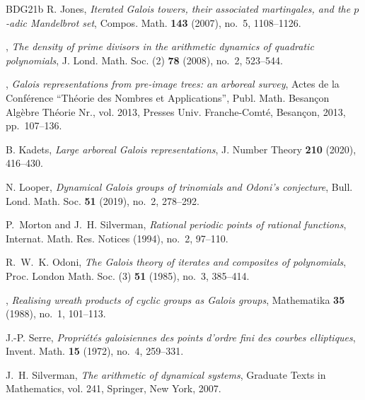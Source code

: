 \begin{thebibliography}{BDG{\etalchar{+}}21b}
R. Jones, \emph{Iterated {G}alois towers, their associated martingales, and
  the {$p$}-adic {M}andelbrot set}, Compos. Math. \textbf{143} (2007), no.~5,
  1108--1126.

\bysame, \emph{The density of prime divisors in the arithmetic dynamics of
  quadratic polynomials}, J. Lond. Math. Soc. (2) \textbf{78} (2008), no.~2,
  523--544.

\bysame, \emph{Galois representations from pre-image trees: an arboreal
  survey}, Actes de la {C}onf\'erence ``{T}h\'eorie des {N}ombres et
  {A}pplications'', Publ. Math. Besan\c con Alg\`ebre Th\'eorie Nr., vol. 2013,
  Presses Univ. Franche-Comt\'e, Besan\c con, 2013, pp.~107--136.

B. Kadets, \emph{Large arboreal {G}alois representations}, J. Number Theory
  \textbf{210} (2020), 416--430.

N. Looper, \emph{Dynamical {G}alois groups of trinomials and {O}doni's
  conjecture}, Bull. Lond. Math. Soc. \textbf{51} (2019), no.~2, 278--292.

P.~Morton and J.~H. Silverman, \emph{Rational periodic points of rational
  functions}, Internat. Math. Res. Notices (1994), no.~2, 97--110.

R.~W.~K. Odoni, \emph{The {G}alois theory of iterates and composites of
  polynomials}, Proc. London Math. Soc. (3) \textbf{51} (1985), no.~3,
  385--414.

\bysame, \emph{Realising wreath products of cyclic groups as {G}alois groups},
  Mathematika \textbf{35} (1988), no.~1, 101--113.

J.-P. Serre, \emph{Propri\'et\'es galoisiennes des points d'ordre fini des
  courbes elliptiques}, Invent. Math. \textbf{15} (1972), no.~4, 259--331.

J.~H. Silverman, \emph{The arithmetic of dynamical systems}, Graduate Texts in
  Mathematics, vol. 241, Springer, New York, 2007.

\end{thebibliography}
